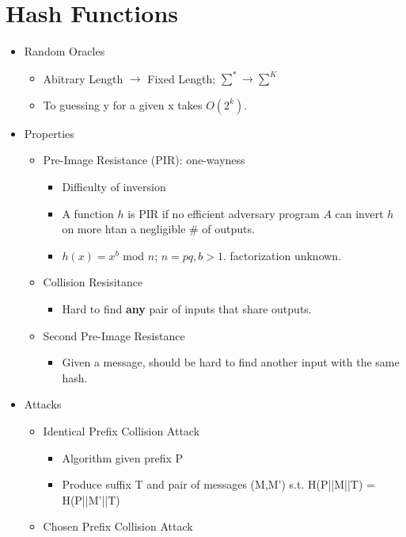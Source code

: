 \section{Hash Functions}
\begin{itemize}
\item Random Oracles
    \begin{itemize}
    \item Abitrary Length $\rightarrow$ Fixed Length; $\sum^* \rightarrow \sum^K$
    \item To guessing y for a given x takes $O(2^k)$.
    \end{itemize}
\item Properties
    \begin{itemize}
    \item Pre-Image Resistance (PIR): one-wayness
        \begin{itemize}
        \item Difficulty of inversion
        \item A function $h$ is PIR if no efficient adversary program $A$ can invert $h$ on more htan a negligible # of outputs.
        \item $h(x) = x^b$ mod $n$; $n=pq, b>1$. factorization unknown.
        \end{itemize}
    \item Collision Resisitance
        \begin{itemize}
        \item Hard to find \textbf{any} pair of inputs that share outputs.
        \end{itemize}
    \item Second Pre-Image Resistance
        \begin{itemize}
        \item Given a message, should be hard to find another input with the same hash.
        \end{itemize}
    \end{itemize}
\item Attacks
    \begin{itemize}
    \item Identical Prefix Collision Attack
        \begin{itemize}
        \item Algorithm given prefix P
        \item Produce suffix T and pair of messages (M,M') s.t. H(P||M||T) = H(P||M'||T)
        \end{itemize}
    \item Chosen Prefix Collision Attack

\end{itemize}
\end{itemize}
